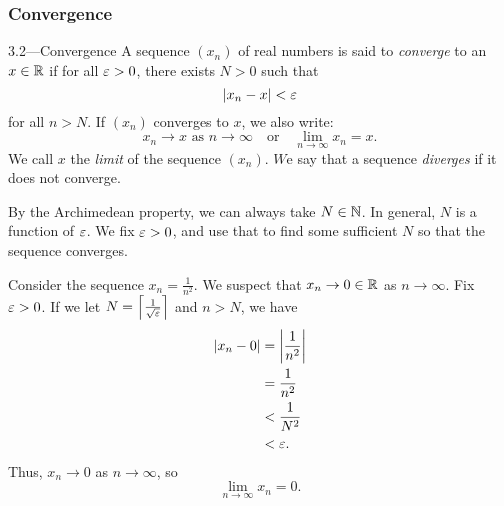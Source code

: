 \documentclass[class=article, crop=false]{standalone}
\begin{document}
  \subsubsection{Convergence}
  \begin{definition}{3.2---Convergence}
    A sequence $(x_n)$ of real numbers is said to \emph{converge} to an $x\in\mathbb{R}$ if for all $\varepsilon > 0$, there exists $N > 0$ such that
    \[
      \left\lvert x_n - x \right\rvert < \varepsilon
    \]
    for all $n > N$. If $(x_n)$ converges to $x$, we also write:
    \[
      x_n\to x \text{ as }n\to \infty \quad \text{or}\quad \lim_{n\to\infty}x_n = x.
    \]
    We call $x$ the \emph{limit} of the sequence $(x_n)$. $W$e say that a sequence \emph{diverges} if it does not converge.
  \end{definition}
  \begin{note}{}
    By the Archimedean property, we can always take $N\in\mathbb{N}$. In general, $N$ is a function of $\varepsilon$. We fix $\varepsilon > 0$, and use that to find some sufficient $N$ so that the sequence converges.
  \end{note}
  \begin{example}{}
    Consider the sequence $x_n = \frac{1}{n^2}$. We suspect that $x_n\to 0\in\mathbb{R}$ as $n\to\infty$. Fix $\varepsilon > 0$. If we let $N = \left\lceil \frac{1}{\sqrt{\varepsilon}} \right\rceil$ and $n > N$, we have
    \begin{align*}
      \left\lvert x_n - 0 \right\rvert &= \left\lvert \frac{1}{n^2} \right\rvert \\
                    &= \frac{1}{n^2} \\
                    &< \frac{1}{N^2} \\
                    &< \varepsilon.
    \end{align*}
    Thus, $x_n\to 0$ as $n\to\infty$, so
    \[
      \lim_{n\to \infty}x_n = 0.
    \]
  \end{example}
\end{document}
